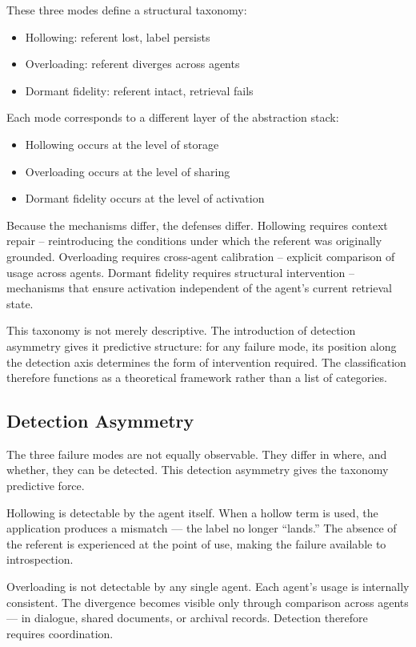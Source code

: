 \documentclass[11pt]{article}
\begin{document}
These three modes define a structural taxonomy:

\begin{itemize}
\item Hollowing: referent lost, label persists
\item Overloading: referent diverges across agents
\item Dormant fidelity: referent intact, retrieval fails
\end{itemize}

Each mode corresponds to a different layer of the abstraction stack:

\begin{itemize}
\item Hollowing occurs at the level of storage
\item Overloading occurs at the level of sharing
\item Dormant fidelity occurs at the level of activation
\end{itemize}

Because the mechanisms differ, the defenses differ. Hollowing requires context repair -- reintroducing the conditions under which the referent was originally grounded. Overloading requires cross-agent calibration -- explicit comparison of usage across agents. Dormant fidelity requires structural intervention -- mechanisms that ensure activation independent of the agent's current retrieval state.

This taxonomy is not merely descriptive. The introduction of detection asymmetry gives it predictive structure: for any failure mode, its position along the detection axis determines the form of intervention required. The classification therefore functions as a theoretical framework rather than a list of categories.

\subsection{Detection Asymmetry}

The three failure modes are not equally observable. They differ in where, and whether, they can be detected. This detection asymmetry gives the taxonomy predictive force.

Hollowing is detectable by the agent itself. When a hollow term is used, the application produces a mismatch — the label no longer ``lands.'' The absence of the referent is experienced at the point of use, making the failure available to introspection.

Overloading is not detectable by any single agent. Each agent’s usage is internally consistent. The divergence becomes visible only through comparison across agents — in dialogue, shared documents, or archival records. Detection therefore requires coordination.
\end{document}
